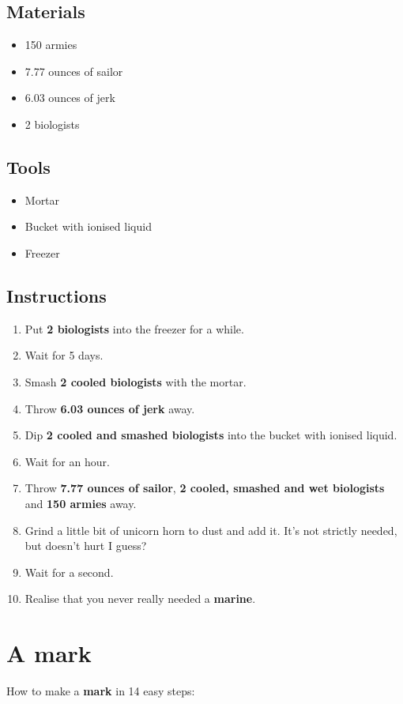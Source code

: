 \documentclass{article}
\begin{document}
\subsection{Materials}\begin{itemize}
\item 
150 armies
\item 
7.77 ounces of sailor
\item 
6.03 ounces of jerk
\item 
2 biologists
\end{itemize}
\subsection{Tools}\begin{itemize}
\item 
Mortar
\item 
Bucket with ionised liquid
\item 
Freezer
\end{itemize}
\subsection{Instructions}\begin{enumerate}
\item 
Put \textbf{2 biologists} into the freezer for a while.
\item 
Wait for 5 days.
\item 
Smash \textbf{2 cooled biologists} with the mortar.
\item 
Throw \textbf{6.03 ounces of jerk} away.
\item 
Dip \textbf{2 cooled and smashed biologists} into the bucket with ionised liquid.
\item 
Wait for an hour.
\item 
Throw \textbf{7.77 ounces of sailor}, \textbf{2 cooled, smashed and wet biologists} and \textbf{150 armies} away.
\item 
Grind a little bit of unicorn horn to dust and add it. It's not strictly needed, but doesn't hurt I guess?
\item 
Wait for a second.
\item 
Realise that you never really needed a \textbf{marine}.
\end{enumerate}
\newpage
\section{A mark}How to make a \textbf{mark} in 14 easy steps:
\end{document}
